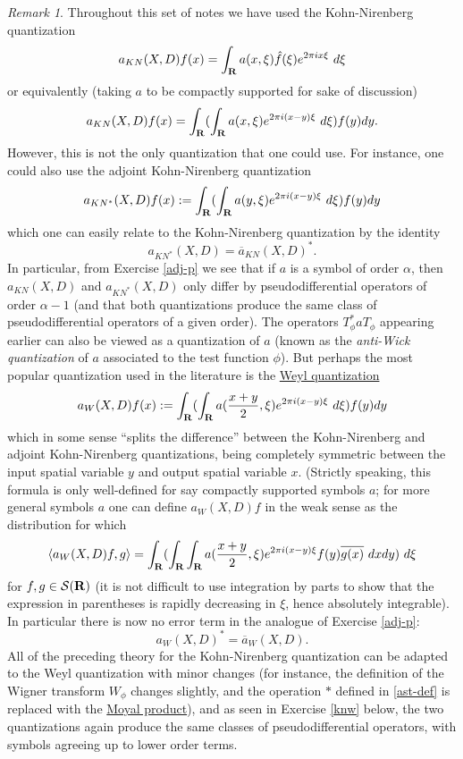 \documentclass[11pt]{article}
\theoremstyle{definition}
\theoremstyle{remark}
\newtheorem{remark}[theorem]{Remark}
\begin{document}
\begin{remark}
 \label{weyl} Throughout this set of notes we have used the Kohn-Nirenberg quantization 
\[\displaystyle  a_{KN}(X,D) f(x) = \int_{\bf R} a(x,\xi) \hat f(\xi) e^{2\pi i x \xi}\ d\xi\]
 or equivalently (taking \({a}\) to be compactly supported for sake of discussion) 
\[\displaystyle  a_{KN}(X,D) f(x) = \int_{\bf R} (\int_{\bf R} a(x,\xi) e^{2\pi i (x-y) \xi}\ d\xi) f(y) dy.\]
 However, this is not the only quantization that one could use. For instance, one could also use the adjoint Kohn-Nirenberg quantization 
\[\displaystyle  a_{KN^*}(X,D) f(x) := \int_{\bf R} (\int_{\bf R} a(y,\xi) e^{2\pi i (x-y) \xi}\ d\xi) f(y) dy\]
 which one can easily relate to the Kohn-Nirenberg quantization by the identity 
\[\displaystyle  a_{KN^*}(X,D) = \overline{a}_{KN}(X,D)^*.\]
 In particular, from Exercise \ref{adj-p} we see that if \({a}\) is a symbol of order \({\alpha}\), then \({a_{KN}(X,D)}\) and \({a_{KN^*}(X,D)}\) only differ by pseudodifferential operators of order \({\alpha-1}\) (and that both quantizations produce the same class of pseudodifferential operators of a given order). The operators \({T_\phi^* a T_\phi}\) appearing earlier can also be viewed as a quantization of \({a}\) (known as the \emph{anti-Wick quantization} of \({a}\) associated to the test function \({\phi}\)). But perhaps the most popular quantization used in the literature is the \href{https://en.wikipedia.org/wiki/Wigner%E2%80%93Weyl_transform}{Weyl quantization} 
\[\displaystyle  a_{W}(X,D) f(x) := \int_{\bf R} (\int_{\bf R} a(\frac{x+y}{2},\xi) e^{2\pi i (x-y) \xi}\ d\xi) f(y) dy\]
 which in some sense “splits the difference” between the Kohn-Nirenberg and adjoint Kohn-Nirenberg quantizations, being completely symmetric between the input spatial variable \({y}\) and output spatial variable \({x}\). (Strictly speaking, this formula is only well-defined for say compactly supported symbols \({a}\); for more general symbols \({a}\) one can define \({a_W(X,D) f}\) in the weak sense as the distribution for which 
\[\displaystyle  \langle a_{W}(X,D) f, g \rangle = \int_{\bf R} (\int_{\bf R} \int_{\bf R} a(\frac{x+y}{2},\xi) e^{2\pi i (x-y) \xi} f(y) \overline{g(x)}\ dx dy)\ d\xi\]
 for \({f,g \in {\mathcal S}({\bf R})}\) (it is not difficult to use integration by parts to show that the expression in parentheses is rapidly decreasing in \({\xi}\), hence absolutely integrable). In particular there is now no error term in the analogue of Exercise \ref{adj-p}: 
\[\displaystyle  a_W(X,D)^* = \overline{a}_W(X,D).\]
 All of the preceding theory for the Kohn-Nirenberg quantization can be adapted to the Weyl quantization with minor changes (for instance, the definition of the Wigner transform \({W_\phi}\) changes slightly, and the operation \({\ast}\) defined in \eqref{ast-def} is replaced with the \href{https://en.wikipedia.org/wiki/Moyal_product}{Moyal product}), and as seen in Exercise \ref{knw} below, the two quantizations again produce the same classes of pseudodifferential operators, with symbols agreeing up to lower order terms. 
\end{remark}
\end{document}

